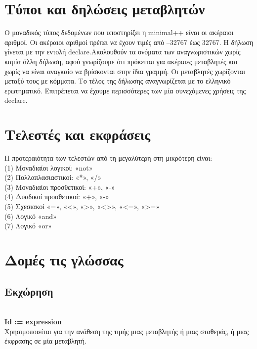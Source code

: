 \documentclass[12pt,a4paper,a4paper]{report}
\begin{document}
\section{Τύποι και δηλώσεις μεταβλητών}
Ο μοναδικός τύπος δεδομένων που υποστηρίζει η minimal++ είναι οι ακέραιοι αριθμοί. Οι ακέραιοι αριθμοί πρέπει να έχουν τιμές από –32767 έως 32767. Η δήλωση γίνεται με την εντολή declare.Ακολουθούν τα ονόματα των αναγνωριστικών χωρίς καμία άλλη δήλωση, αφού γνωρίζουμε ότι πρόκειται για ακέραιες μεταβλητές και χωρίς να είναι αναγκαίο να βρίσκονται στην ίδια γραμμή. Οι μεταβλητές χωρίζονται μεταξύ τους με κόμματα. Το τέλος της δήλωσης αναγνωρίζεται με το ελληνικό ερωτηματικό. Επιτρέπεται να έχουμε περισσότερες των μία συνεχόμενες χρήσεις της declare. 

\section{Τελεστές και εκφράσεις}
 Η προτεραιότητα των τελεστών από τη μεγαλύτερη στη μικρότερη είναι:\\
 (1) Μοναδιαίοι λογικοί: «not»\\
 (2) Πολλαπλασιαστικοί: «*», «/»\\
 (3) Μοναδιαίοι προσθετικοί: «+», «-»\\
 (4) Δυαδικοί προσθετικοί: «+», «-»\\
 (5) Σχεσιακοί «=», «<», «>», «<>», «<=», «>=»\\
 (6) Λογικό «and»\\
 (7) Λογικό «or»\\
 
 \section{Δομές τις γλώσσας}
 \subsection{Eκχώρηση}
\hspace{10mm}\\
\textbf{Id := expression }\\
 Χρησιμοποιείται για την ανάθεση της τιμής μιας μεταβλητής ή μιας σταθεράς, ή  μιας έκφρασης σε μία μεταβλητή.\\
 
 \newpage
 
\end{document}
